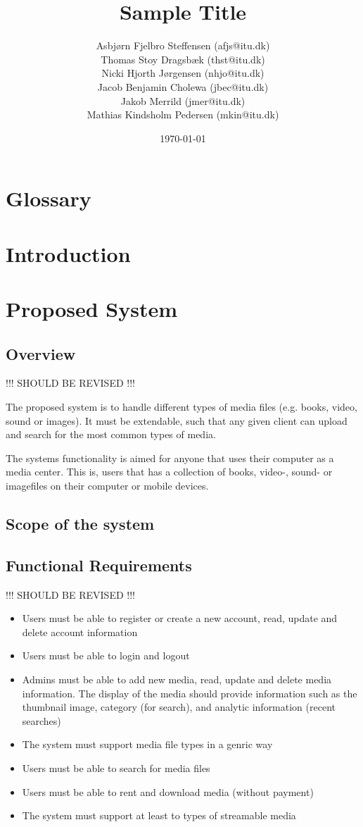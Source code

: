 \documentclass{report}
\title{Sample Title}
\date{\today}
\author{Asbj\o rn Fjelbro Steffensen (afjs@itu.dk)\\ Thomas Stoy Dragsb\ae k (thst@itu.dk)\\ Nicki Hjorth J\o rgensen (nhjo@itu.dk)\\ Jacob Benjamin Cholewa (jbec@itu.dk)\\ Jakob Merrild (jmer@itu.dk)\\ Mathias Kindsholm Pedersen (mkin@itu.dk)}
\begin{document}
\maketitle
\newpage
\tableofcontents

\chapter{Glossary}


\chapter{Introduction}



\chapter{Proposed System}

\section{Overview}

!!! SHOULD BE REVISED !!!

The proposed system is to handle different types of media files (e.g. books, video, sound or images). It must be extendable, such that any given client can upload and search for the most common types of media.

The systems functionality is aimed for anyone that uses their computer as a media center. This is, users that has a collection of books, video-, sound- or imagefiles on their computer or mobile devices.

\section{Scope of the system}


\section{Functional Requirements}
!!! SHOULD BE REVISED !!!
\begin{itemize}
\item Users must be able to register or create a new account, read, update and delete  account information
\item Users must be able to login and logout
\item Admins must be able to add new media, read, update and delete media information. The display of the media should provide information such as the thumbnail image, category (for search), and analytic information (recent searches)
\item The system must support media file types in a genric way
\item Users must be able to search for media files
\item Users must be able to rent and download media (without payment)
\item The system must support at least to types of streamable media
\end{itemize}
\end{document}
